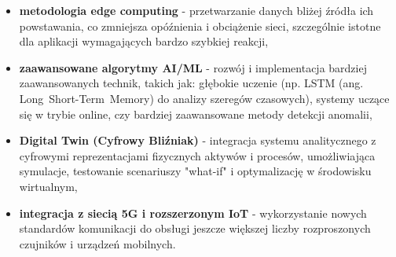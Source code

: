 \begin{itemize}
    \item \textbf{metodologia edge computing} - przetwarzanie danych bliżej źródła ich powstawania, co zmniejsza opóźnienia i obciążenie sieci, szczególnie istotne dla aplikacji wymagających bardzo szybkiej reakcji,
    \item \textbf{zaawansowane algorytmy AI/ML} - rozwój i implementacja bardziej zaawansowanych technik, takich jak: głębokie uczenie (np. LSTM (ang. \mbox{Long Short-Term Memory}) do analizy szeregów czasowych), systemy uczące się w trybie online, czy bardziej zaawansowane metody detekcji anomalii,
    \item \textbf{Digital Twin (Cyfrowy Bliźniak)} - integracja systemu analitycznego z cyfrowymi reprezentacjami fizycznych aktywów i procesów, umożliwiająca symulacje, testowanie scenariuszy "what-if" i optymalizację w środowisku wirtualnym,
    \item \textbf{integracja z siecią 5G i rozszerzonym IoT} - wykorzystanie nowych standardów komunikacji do obsługi jeszcze większej liczby rozproszonych czujników i urządzeń mobilnych.
\end{itemize}